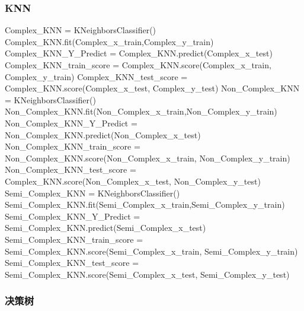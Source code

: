 \documentclass[
]{article}
\newenvironment{Shaded}{}{}
\newcommand{\NormalTok}[1]{#1}
\newcommand{\OperatorTok}[1]{\textcolor[rgb]{0.40,0.40,0.40}{#1}}
\begin{document}
\hypertarget{header-n286}{%
\subsubsection{KNN}\label{header-n286}}

\begin{Shaded}
\begin{Highlighting}[]
\NormalTok{Complex\_KNN }\OperatorTok{=}\NormalTok{ KNeighborsClassifier()}
\NormalTok{Complex\_KNN.fit(Complex\_x\_train,Complex\_y\_train)}
\NormalTok{Complex\_KNN\_Y\_Predict }\OperatorTok{=}\NormalTok{ Complex\_KNN.predict(Complex\_x\_test)}
\NormalTok{Complex\_KNN\_train\_score }\OperatorTok{=}\NormalTok{ Complex\_KNN.score(Complex\_x\_train, Complex\_y\_train)}
\NormalTok{Complex\_KNN\_test\_score }\OperatorTok{=}\NormalTok{ Complex\_KNN.score(Complex\_x\_test, Complex\_y\_test)}
\NormalTok{Non\_Complex\_KNN }\OperatorTok{=}\NormalTok{ KNeighborsClassifier()}
\NormalTok{Non\_Complex\_KNN.fit(Non\_Complex\_x\_train,Non\_Complex\_y\_train)}
\NormalTok{Non\_Complex\_KNN\_Y\_Predict }\OperatorTok{=}\NormalTok{ Non\_Complex\_KNN.predict(Non\_Complex\_x\_test)}
\NormalTok{Non\_Complex\_KNN\_train\_score }\OperatorTok{=}\NormalTok{ Non\_Complex\_KNN.score(Non\_Complex\_x\_train, Non\_Complex\_y\_train)}
\NormalTok{Non\_Complex\_KNN\_test\_score }\OperatorTok{=}\NormalTok{ Complex\_KNN.score(Non\_Complex\_x\_test, Non\_Complex\_y\_test)}
\NormalTok{Semi\_Complex\_KNN }\OperatorTok{=}\NormalTok{ KNeighborsClassifier()}
\NormalTok{Semi\_Complex\_KNN.fit(Semi\_Complex\_x\_train,Semi\_Complex\_y\_train)}
\NormalTok{Semi\_Complex\_KNN\_Y\_Predict }\OperatorTok{=}\NormalTok{ Semi\_Complex\_KNN.predict(Semi\_Complex\_x\_test)}
\NormalTok{Semi\_Complex\_KNN\_train\_score }\OperatorTok{=}\NormalTok{ Semi\_Complex\_KNN.score(Semi\_Complex\_x\_train, Semi\_Complex\_y\_train)}
\NormalTok{Semi\_Complex\_KNN\_test\_score }\OperatorTok{=}\NormalTok{ Semi\_Complex\_KNN.score(Semi\_Complex\_x\_test, Semi\_Complex\_y\_test)}
\end{Highlighting}
\end{Shaded}

\hypertarget{header-n289}{%
\subsubsection{决策树}\label{header-n289}}
\end{document}
